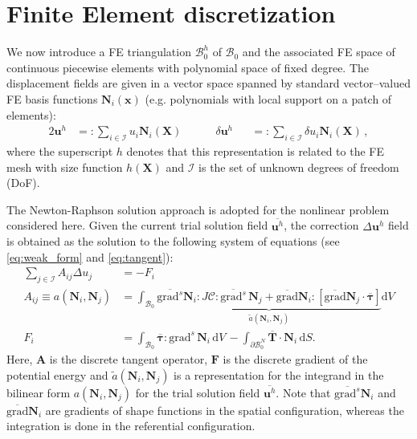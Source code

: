 \documentclass[times,doublespace]{nmeauth}
\def\gz  #1{           \mbox{$\boldsymbol{#1}$}}
\def\grad {\mbox{grad}}
\def\d {\mbox{d}}
\def\mcl  #1{               {\mathcal #1}}
\begin{document}
\section{Finite Element discretization}
\label{sec:fe}

We now introduce a FE triangulation $\mathcal{B}^h_0$ of $\mcl B_0$ and
the associated FE space of continuous piecewise elements with polynomial space of fixed degree. %
The displacement fields are given in
a vector space spanned by standard vector--valued FE basis functions $\gz N_i(\gz x)$ (e.g. polynomials with local support on a patch of elements):
\begin{alignat}{2}
       \gz u^h &=:  \sum_{i \in \mcl I} u_i \gz N_i (\gz X) \quad \quad \quad
\delta \gz u^h &&=: \sum_{i \in \mcl I} \delta u_i \gz N_i (\gz X) \,,
\end{alignat}
where the superscript $h$ denotes that this representation is related to the FE mesh with size function $h(\gz X)$ and $\mcl I$ is the set of unknown degrees of freedom (DoF).

The Newton-Raphson solution approach is adopted for the nonlinear problem considered here.
Given the current trial solution field $\overline{\gz u^h}$, the correction $\Delta \gz u^h$ field is obtained as the solution to the following system of equations (see \eqref{eq:weak_form} and \eqref{eq:tangent}):
\begin{align}
  \sum_{j \in \mcl I} A_{ij} \Delta u_j &= - F_i  \label{eq:linear_system} \\
  A_{ij} \equiv a(\gz N_i, \gz N_j) &=
  \int_{\mcl B_0}
  \underbrace{
  \overline{\grad^s} \gz N_i : J \boldsymbol{\mathcal{C}} : \overline{\grad^s} \, \gz N_j
  +
  \overline{\grad}\gz N_i :
  \left[
  \overline{\grad} \gz N_j \cdot
  \overline{\gz \tau}
  \right]
  }_{\displaystyle \tilde{a}(\gz N_i, \gz N_j)}
  \d V
  \label{eq:algebraic_tangent}
  \\
  F_i &=
  \int_{\mcl B_0} \overline{\gz \tau} : \grad^{s} \, \gz N_i \, \d V \,
  -
  \int_{\partial \mcl B_0^N} \overline{\gz T} \cdot \gz N_i \, \d S.
\end{align}
Here, $\gz A$ is the discrete tangent operator, $\gz F$ is the discrete gradient of the potential energy
and $\tilde{a}(\gz N_i, \gz N_j)$ is a representation for the integrand in the bilinear form $a(\gz N_i, \gz N_j)$ for the trial solution field $\overline{\gz u^h}$.
Note that $\overline{\grad^s} \gz N_i$ and $\overline{\grad} \gz N_i$ are gradients of shape functions in the spatial configuration, whereas the integration is done in the referential configuration.
\end{document}
